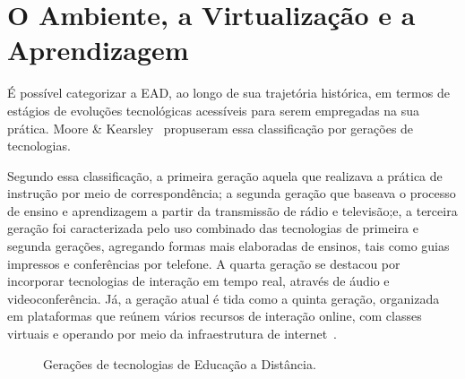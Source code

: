 \section{O Ambiente, a Virtualização e a Aprendizagem}%

É possível categorizar a EAD, ao longo de sua trajetória histórica, em termos de estágios de evoluções tecnológicas acessíveis para serem empregadas na sua prática. Moore \& Kearsley~\cite{moore2007} propuseram essa classificação por gerações de tecnologias. 

Segundo essa classificação, a primeira geração aquela que realizava a prática de instrução por meio de correspondência; a segunda geração que baseava o processo de ensino e aprendizagem a partir da transmissão de rádio e televisão;e, a terceira geração foi caracterizada pelo uso combinado das tecnologias de primeira e segunda gerações, agregando formas mais elaboradas de ensinos, tais como guias impressos e conferências por telefone. A quarta geração se destacou por incorporar tecnologias de interação em tempo real, através de áudio e videoconferência. Já, a geração atual é tida como a quinta geração, organizada em plataformas que reúnem vários recursos de interação online, com classes virtuais e operando por meio da infraestrutura de internet~\cite{dotta@ead}. 

\begin{figure}[h]
    \centering
    \caption{Gerações de tecnologias de Educação a Distância.}
    \vspace{2mm}
    \label{fig:geracao}
    \vspace{2mm}
\end{figure}      
  
